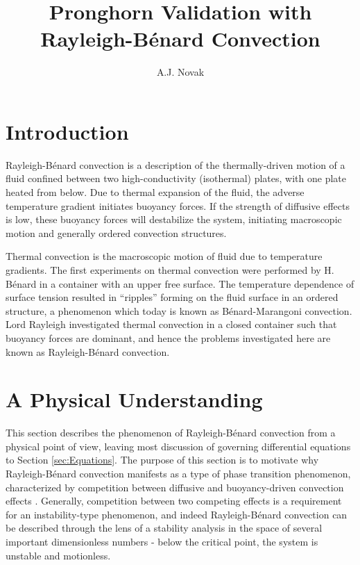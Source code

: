 \documentclass[10pt]{article}
\numberwithin{equation}{section} %
\begin{document}
\title{Pronghorn Validation with Rayleigh-B\'enard Convection}
\author{A.J. Novak}
\maketitle

\tableofcontents

\clearpage

\section{Introduction}

Rayleigh-B\'enard convection is a description of the thermally-driven motion of a fluid confined between two high-conductivity (isothermal) plates, with one plate heated from below. Due to thermal expansion of the fluid, the adverse temperature gradient initiates buoyancy forces. If the strength of diffusive effects is low, these buoyancy forces will destabilize the system, initiating macroscopic motion and generally ordered convection structures.

Thermal convection is the macroscopic motion of fluid due to temperature gradients. The first experiments on thermal convection were performed by H. B\'enard in a container with an upper free surface. The temperature dependence of surface tension resulted in ``ripples'' forming on the fluid surface in an ordered structure, a phenomenon which today is known as B\'enard-Marangoni convection. Lord Rayleigh investigated thermal convection in a closed container such that buoyancy forces are dominant, and hence the problems investigated here are known as Rayleigh-B\'enard convection.

\clearpage
\section{A Physical Understanding}
This section describes the phenomenon of Rayleigh-B\'enard convection from a physical point of view, leaving most discussion of governing differential equations to Section \ref{sec:Equations}. The purpose of this section is to motivate why Rayleigh-B\'enard convection manifests as a type of phase transition phenomenon, characterized by competition between diffusive and buoyancy-driven convection effects \cite{berge}. Generally, competition between two competing effects is a requirement for an instability-type phenomenon, and indeed Rayleigh-B\'enard convection can be described through the lens of a stability analysis in the space of several important dimensionless numbers - below the critical point, the system is unstable and motionless. 
\end{document}
